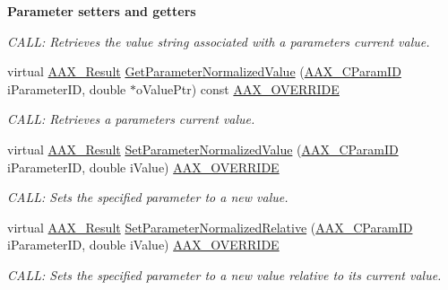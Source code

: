 \begin{Indent}{\bf Parameter setters and getters}
\begin{DoxyCompactItemize}
\begin{DoxyCompactList}\small\item\em C\+A\+L\+L\+: Retrieves the value string associated with a parameter\textquotesingle{}s current value. \end{DoxyCompactList}\item 
virtual \hyperlink{a00149_a4d8f69a697df7f70c3a8e9b8ee130d2f}{A\+A\+X\+\_\+\+Result} \hyperlink{a00018_a1ba2eadb31d2bf42016266585ad1b00a}{Get\+Parameter\+Normalized\+Value} (\hyperlink{a00149_a1440c756fe5cb158b78193b2fc1780d1}{A\+A\+X\+\_\+\+C\+Param\+I\+D} i\+Parameter\+I\+D, double $\ast$o\+Value\+Ptr) const \hyperlink{a00149_ac2f24a5172689ae684344abdcce55463}{A\+A\+X\+\_\+\+O\+V\+E\+R\+R\+I\+D\+E}
\begin{DoxyCompactList}\small\item\em C\+A\+L\+L\+: Retrieves a parameter\textquotesingle{}s current value. \end{DoxyCompactList}\item 
virtual \hyperlink{a00149_a4d8f69a697df7f70c3a8e9b8ee130d2f}{A\+A\+X\+\_\+\+Result} \hyperlink{a00018_aa705736fbe6b2cd8cc5721677cea6c20}{Set\+Parameter\+Normalized\+Value} (\hyperlink{a00149_a1440c756fe5cb158b78193b2fc1780d1}{A\+A\+X\+\_\+\+C\+Param\+I\+D} i\+Parameter\+I\+D, double i\+Value) \hyperlink{a00149_ac2f24a5172689ae684344abdcce55463}{A\+A\+X\+\_\+\+O\+V\+E\+R\+R\+I\+D\+E}
\begin{DoxyCompactList}\small\item\em C\+A\+L\+L\+: Sets the specified parameter to a new value. \end{DoxyCompactList}\item 
virtual \hyperlink{a00149_a4d8f69a697df7f70c3a8e9b8ee130d2f}{A\+A\+X\+\_\+\+Result} \hyperlink{a00018_a5aac0f17339a337df23f4be9a126c950}{Set\+Parameter\+Normalized\+Relative} (\hyperlink{a00149_a1440c756fe5cb158b78193b2fc1780d1}{A\+A\+X\+\_\+\+C\+Param\+I\+D} i\+Parameter\+I\+D, double i\+Value) \hyperlink{a00149_ac2f24a5172689ae684344abdcce55463}{A\+A\+X\+\_\+\+O\+V\+E\+R\+R\+I\+D\+E}
\begin{DoxyCompactList}\small\item\em C\+A\+L\+L\+: Sets the specified parameter to a new value relative to its current value. \end{DoxyCompactList}\end{DoxyCompactItemize}
\end{Indent}
